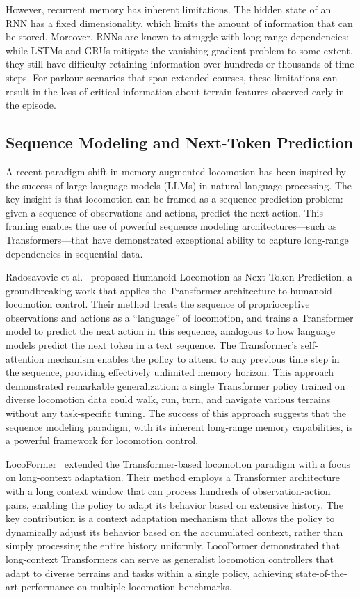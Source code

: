 However, recurrent memory has inherent limitations. The hidden state of an RNN has a fixed dimensionality, which limits the amount of information that can be stored. Moreover, RNNs are known to struggle with long-range dependencies: while LSTMs and GRUs mitigate the vanishing gradient problem to some extent, they still have difficulty retaining information over hundreds or thousands of time steps. For parkour scenarios that span extended courses, these limitations can result in the loss of critical information about terrain features observed early in the episode.

\subsection{Sequence Modeling and Next-Token Prediction}

A recent paradigm shift in memory-augmented locomotion has been inspired by the success of large language models (LLMs) in natural language processing. The key insight is that locomotion can be framed as a sequence prediction problem: given a sequence of observations and actions, predict the next action. This framing enables the use of powerful sequence modeling architectures---such as Transformers---that have demonstrated exceptional ability to capture long-range dependencies in sequential data.

Radosavovic et al.~\cite{radosavovic2024nexttoken} proposed Humanoid Locomotion as Next Token Prediction, a groundbreaking work that applies the Transformer architecture to humanoid locomotion control. Their method treats the sequence of proprioceptive observations and actions as a ``language'' of locomotion, and trains a Transformer model to predict the next action in this sequence, analogous to how language models predict the next token in a text sequence. The Transformer's self-attention mechanism enables the policy to attend to any previous time step in the sequence, providing effectively unlimited memory horizon. This approach demonstrated remarkable generalization: a single Transformer policy trained on diverse locomotion data could walk, run, turn, and navigate various terrains without any task-specific tuning. The success of this approach suggests that the sequence modeling paradigm, with its inherent long-range memory capabilities, is a powerful framework for locomotion control.

LocoFormer~\cite{liu2024locoformer} extended the Transformer-based locomotion paradigm with a focus on long-context adaptation. Their method employs a Transformer architecture with a long context window that can process hundreds of observation-action pairs, enabling the policy to adapt its behavior based on extensive history. The key contribution is a context adaptation mechanism that allows the policy to dynamically adjust its behavior based on the accumulated context, rather than simply processing the entire history uniformly. LocoFormer demonstrated that long-context Transformers can serve as generalist locomotion controllers that adapt to diverse terrains and tasks within a single policy, achieving state-of-the-art performance on multiple locomotion benchmarks.

